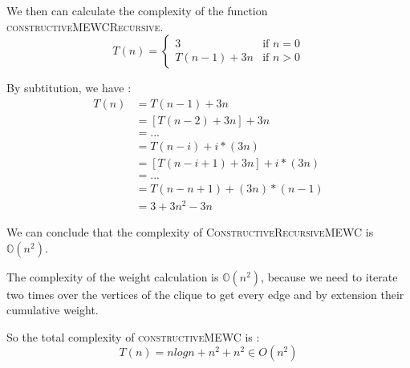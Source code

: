 We then can calculate the complexity of the function \textsc{constructiveMEWCRecursive}. 
\begin{equation}
    T(n)=\begin{cases}
        3        & \text{if } n=0 \\
        T(n-1) + 3n & \text{if } n>0
    \end{cases}
\end{equation}

By subtitution, we have :
\begin{align}
    T(n)&=T(n-1)+3n\\
    &=[T(n-2)+3n]+3n\\
    &=...\\
    &=T(n - i) + i*(3n) \\
    &=[T(n - i  + 1) + 3n] + i*(3n) \\
    &=...\\
    &=T(n - n + 1)+(3n)*(n-1) \\
    &= 3 + 3n^2 - 3n
\end{align}

We can conclude that the complexity of \textsc{ConstructiveRecursiveMEWC} is $\mathbb{O}(n^2)$.
\bigskip

The complexity of the weight calculation is $\mathbb{O}(n^2)$, because we need to iterate two times over the vertices of the clique to get every edge and by extension their cumulative weight.
\bigskip

So the total complexity of \textsc{constructiveMEWC} is : 
$$ T(n) = n logn + n^2 + n^2 \in O(n^2) $$